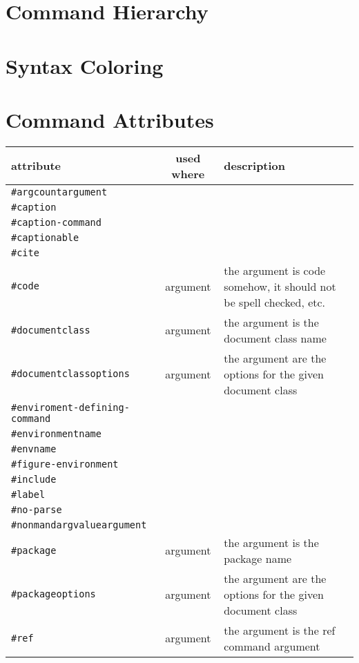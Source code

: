 \documentclass{report}
\begin{document}
\section{Command Hierarchy}

\section{Syntax Coloring}

\section{Command Attributes}

\begin{tabular}{| l | c | p{5cm} |}
\hline
attribute & used where & description \\
\hline
\hline
\verb+#argcountargument+ & & \\\hline
\verb+#caption+ & & \\\hline
\verb+#caption-command+ & & \\\hline
\verb+#captionable+ & & \\\hline
\verb+#cite+ & & \\\hline
\verb+#code+ & argument & the argument is code somehow, it should not be spell checked, etc.\\\hline
\verb+#documentclass+ & argument & the argument is the document class name\\\hline
\verb+#documentclassoptions+ & argument & the argument are the options for the given document class\\\hline
\verb+#enviroment-defining-command+ & & \\\hline
\verb+#environmentname+ & & \\\hline
\verb+#envname+ & & \\\hline
\verb+#figure-environment+ & & \\\hline
\verb+#include+ & & \\\hline
\verb+#label+ & & \\\hline
\verb+#no-parse+ & & \\\hline
\verb+#nonmandargvalueargument+ & & \\\hline
\verb+#package+ & argument & the argument is the package name\\\hline
\verb+#packageoptions+ & argument & the argument are the options for the given document class \\\hline
\verb+#ref+ & argument & the argument is the ref command argument\\\hline

\end{tabular}
\end{document}
